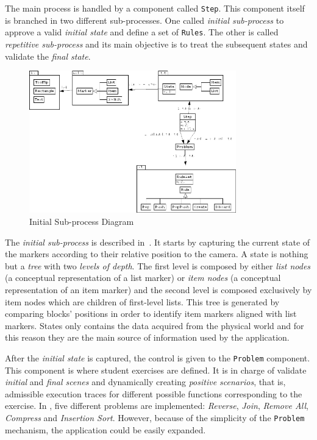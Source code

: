 The main process is handled by a component called \texttt{Step}. This
component itself is branched in two different sub\hyp{}processes. One
called \emph{initial sub\hyp{}process} to approve a valid
\emph{initial state} and define a set of \texttt{Rules}. The other is
called \emph{repetitive sub\hyp{}process} and its main objective is to
treat the subsequent states and validate the \emph{final state}.

\begin{figure}[!h]
  \centering
  \includegraphics[width=0.8\textwidth]{img/diagrams/initial.png}
  \caption{Initial Sub\hyp{}process Diagram}
  \label{fig:dia:initial}
\end{figure}

The \emph{initial sub\hyp{}process} is described
in~. It starts by capturing the current state of
the markers according to their relative position to the camera. A
state is nothing but a \emph{tree} with two \emph{levels of depth}.
The first level is composed by either \emph{list nodes} (a conceptual
representation of a list marker) or \emph{item nodes} (a conceptual
representation of an item marker) and the second level is composed
exclusively by item nodes which are children of first\hyp{}level
lists. This tree is generated by comparing blocks' positions in order
to identify item markers aligned with list markers. States only
contains the data acquired from the physical world and for this reason
they are the main source of information used by the application.

After the \emph{initial state} is captured, the control is given to
the \texttt{Problem} component. This component is where student
exercises are defined. It is in charge of validate \emph{initial} and
\emph{final scenes} and dynamically creating \emph{positive
  scenarios}, that is, admissible execution traces for different
possible \erlang functions corresponding to the exercise. In \vestige,
five different problems are implemented: \emph{Reverse}, \emph{Join},
\emph{Remove All}, \emph{Compress} and \emph{Insertion Sort}. However,
because of the simplicity of the \texttt{Problem} mechanism, the
application could be easily expanded.

